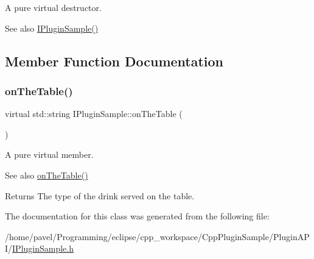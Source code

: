 A pure virtual destructor. 

\begin{DoxySeeAlso}{See also}
\hyperlink{classIPluginSample}{I\+Plugin\+Sample()} 
\end{DoxySeeAlso}


\subsection{Member Function Documentation}
\mbox{\label{classIPluginSample_ad6be189a0df16e7f416f52dc74dd6085}} 
\subsubsection{\texorpdfstring{on\+The\+Table()}{onTheTable()}}
{\footnotesize\ttfamily virtual std\+::string I\+Plugin\+Sample\+::on\+The\+Table (\begin{DoxyParamCaption}{ }\end{DoxyParamCaption})\hspace{0.3cm}{\ttfamily [pure virtual]}}



A pure virtual member. 

\begin{DoxySeeAlso}{See also}
\hyperlink{classIPluginSample_ad6be189a0df16e7f416f52dc74dd6085}{on\+The\+Table()} 
\end{DoxySeeAlso}
\begin{DoxyReturn}{Returns}
The type of the drink served on the table. 
\end{DoxyReturn}


The documentation for this class was generated from the following file\+:\begin{DoxyCompactItemize}
\item 
/home/pavel/\+Programming/eclipse/cpp\+\_\+workspace/\+Cpp\+Plugin\+Sample/\+Plugin\+A\+P\+I/\hyperlink{IPluginSample_8h}{I\+Plugin\+Sample.\+h}\end{DoxyCompactItemize}
